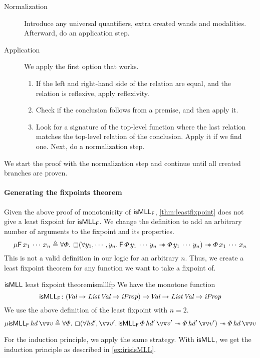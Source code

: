 \documentclass[thesis.tex]{subfiles}
\begin{document}
\begin{description}
  \item[Normalization] Introduce any universal quantifiers, extra created wands and modalities. Afterward, do an application step.
  \item[Application] We apply the first option that works.
        \begin{enumerate}
          \item If the left and right-hand side of the relation are equal, and the relation is reflexive, apply reflexivity.
          \item Check if the conclusion follows from a premise, and then apply it.
          \item Look for a signature of the top-level function where the last relation matches the top-level relation of the conclusion. Apply it if we find one. Next, do a normalization step.
        \end{enumerate}
\end{description}
We start the proof with the normalization step and continue until all created branches are proven.

\paragraph{Generating the fixpoints theorem}
Given the above proof of monotonicity of $\textsf{\upshape isMLL}_{\textsf{\upshape F}}$, \cref{thm:leastfixpoint} does not give a least fixpoint for $\textsf{\upshape isMLL}_{\textsf{\upshape F}}$. We change the definition to add an arbitrary number of arguments to the fixpoint and its properties.
\[
  \lfp\hopred\,\var_1\,\cdots\,\var_n \eqdef \All \pred. \always(\All \varB_1,\cdots,\varB_n. \hopred\, \pred\, \varB_1\,\cdots\,\varB_n \wand \pred\, \varB_1\,\cdots\,\varB_n) \wand \pred \, \var_1\,\cdots\,\var_n
\]
This is not a valid definition in our logic for an arbitrary $n$. Thus, we create a least fixpoint theorem for any function we want to take a fixpoint of.
\begin{example}{$\textsf{\upshape isMLL}$ least fixpoint theorem}{ismlllfp}
  We have the monotone function
  \[ \textsf{\upshape isMLL}_{\textsf{\upshape F}}\colon (\kern-0.2em\textit{Val} \to \textit{List}\ \kern-0.2em\textit{Val} \to \textit{iProp}) \to \kern-0.2em\textit{Val} \to \textit{List}\ \kern-0.2em\textit{Val} \to \textit{iProp} \]
  We use the above definition of the least fixpoint with $n = 2$.
  \[ \lfp\isMLL_\hopred\,\hd\,\vect{\val} \eqdef \All \pred. \always(\All \hd',\vect{\val}'. \isMLL_\hopred\, \pred\, \hd'\, \vect{\val}' \wand \pred\, \hd'\, \vect{\val}') \wand \pred\, \hd\, \vect{\val} \]
\end{example}
For the induction principle, we apply the same strategy. With $\textsf{\upshape isMLL}$, we get the induction principle as described in \cref{ex:irisisMLL}.
\end{document}
